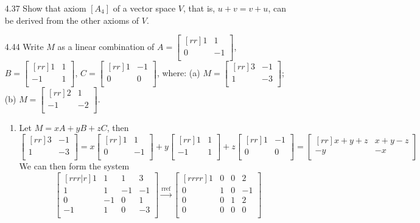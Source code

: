 \documentclass[12pt]{article}
\theoremstyle{plain}
\theoremstyle{definition}
\theoremstyle{plain}
\begin{document}
\begin{enumerate}
\item[4.37]Show that axiom $[A_4]$ of a vector space $V$, that is, $u+v=v+u$, can be derived from the other axioms of $V$.

\item[4.44]Write $M$ as a linear combination of $A=\begin{bmatrix}[rr]1&1\\0&-1\\\end{bmatrix}$, $B=\begin{bmatrix}[rr]1&1\\-1&1\\\end{bmatrix}$, $C=\begin{bmatrix}[rr]1&-1\\0&0\\\end{bmatrix}$, where:
(a) $M=\begin{bmatrix}[rr]3&-1\\1&-3\\\end{bmatrix}$; (b) $M=\begin{bmatrix}[rr]2&1\\-1&-2\\\end{bmatrix}$.
	\begin{enumerate}
	\item Let $M=xA + yB + zC$, then
		\[ \begin{bmatrix}[rr]3&-1\\1&-3\\\end{bmatrix} = x\begin{bmatrix}[rr]1&1\\0&-1\\\end{bmatrix}+y\begin{bmatrix}[rr]1&1\\-1&1\\\end{bmatrix}+z\begin{bmatrix}[rr]1&-1\\0&0\\\end{bmatrix} = \begin{bmatrix}[rr]x+y+z&x+y-z\\-y&-x\\\end{bmatrix} \]
		We can then form the system
		\[ \begin{bmatrix}[rrr|r]1&1&1&3\\1&1&-1&-1\\0&-1&0&1\\-1&1&0&-3\\\end{bmatrix} \xrightarrow[]{\mathrm{rref}} \begin{bmatrix}[rrrr]1&0&0&2\\0&1&0&-1\\0&0&1&2\\0&0&0&0\\\end{bmatrix} \]

\end{enumerate}
\end{enumerate}
\end{document}
